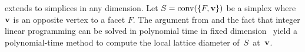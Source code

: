 \begin{remark}
    extends to simplices in any dimension. Let $S = \operatorname{conv}(\{F, \mathbf{v}\})$ be a simplex where $\mathbf{v}$ is an opposite vertex to a facet $F$. The argument from \mbox{} and the fact that integer linear programming can be solved in polynomial time in fixed dimension~\cite{ILP_poly} yield a polynomial-time method to compute the local lattice diameter \mbox{of $S$ at $\mathbf{v}$}.
\end{remark}






